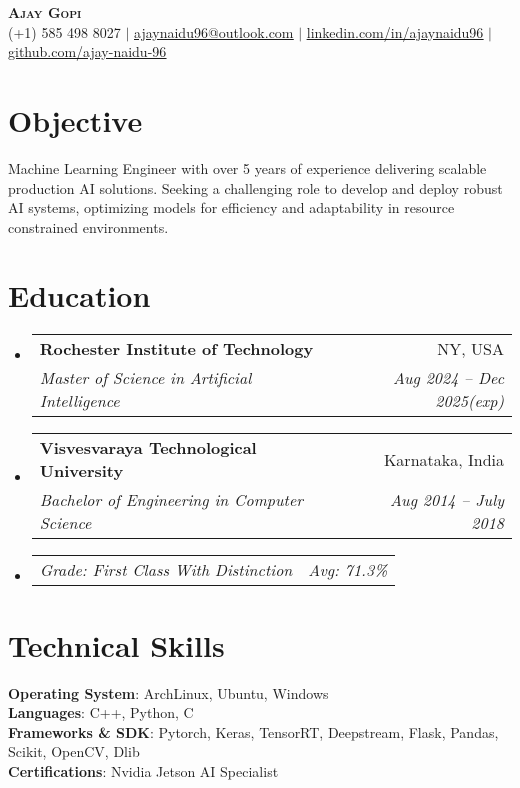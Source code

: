 \documentclass[letterpaper,10pt]{article}
\makeatletter
\newcommand{\resumeSubheading}[4]{
  \vspace{-2pt}\item
    \begin{tabular*}{0.97\textwidth}[t]{l@{\extracolsep{\fill}}r}
      \textbf{#1} & #2 \\
      \textit{\small#3} & \textit{\small #4} \\
    \end{tabular*}\vspace{-7pt}
}
\newcommand{\resumeSubSubheading}[2]{
    \item
    \begin{tabular*}{0.97\textwidth}{l@{\extracolsep{\fill}}r}
      \textit{\small#1} & \textit{\small #2} \\
    \end{tabular*}\vspace{-7pt}
}
\newcommand{\resumeSubHeadingListStart}{\begin{itemize}[leftmargin=0.15in, label={}]}
\newcommand{\resumeSubHeadingListEnd}{\end{itemize}}
\makeatother
\begin{document}
\begin{center}
    \textbf{\Huge \scshape Ajay Gopi} \\ \vspace{1pt}
    \small (+1) 585 498 8027 $|$ \href{mailto:ajaynaidu96@outlook.com}{\underline{ajaynaidu96@outlook.com}} $|$ 
    \href{https://www.linkedin.com/in/ajaynaidu96/}{\underline{linkedin.com/in/ajaynaidu96}} $|$
    \href{https://github.com/ajay-naidu-96/}{\underline{github.com/ajay-naidu-96}}
\end{center}


\section{Objective}
Machine Learning Engineer with over 5 years of experience delivering scalable production AI solutions. Seeking a challenging role to develop and deploy robust AI systems, optimizing models for efficiency and adaptability in resource constrained environments. 

\section{Education}
\resumeSubHeadingListStart
  \resumeSubheading
    {Rochester Institute of Technology}{NY, USA}
    {Master of Science in Artificial Intelligence}{Aug 2024 -- Dec 2025(exp)}
  \resumeSubheading
    {Visvesvaraya Technological University}{Karnataka, India}
    {Bachelor of Engineering in Computer Science}{Aug 2014 -- July 2018}
    \resumeSubSubheading
      {Grade: First Class With Distinction}{Avg: 71.3\%}
\resumeSubHeadingListEnd

  \section{Technical Skills}
    \begin{itemize}[leftmargin=0.15in, label={}]
      \small{\item{
      \textbf{Operating System}{: ArchLinux, Ubuntu, Windows} \\
      \textbf{Languages}{: C++, Python, C} \\
      \textbf{Frameworks \& SDK}{: Pytorch, Keras, TensorRT, Deepstream, Flask, Pandas, Scikit, OpenCV, Dlib} \\
      \textbf{Certifications}{: Nvidia Jetson AI Specialist}
      }}
    \end{itemize}
\end{document}
